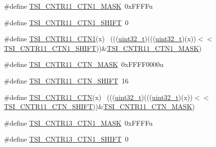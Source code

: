 \begin{DoxyCompactItemize}
\item 
\#define \hyperlink{group___t_s_i___register___masks_ga20e6e5cb203746144a70994cf2b686ef}{T\+S\+I\+\_\+\+C\+N\+T\+R11\+\_\+\+C\+T\+N1\+\_\+\+M\+A\+SK}~0x\+F\+F\+F\+Fu
\item 
\#define \hyperlink{group___t_s_i___register___masks_gad389afd656e4be5c3a0d57d32a401db5}{T\+S\+I\+\_\+\+C\+N\+T\+R11\+\_\+\+C\+T\+N1\+\_\+\+S\+H\+I\+FT}~0
\item 
\#define \hyperlink{group___t_s_i___register___masks_ga5603c5277384add87a5972f0b2360395}{T\+S\+I\+\_\+\+C\+N\+T\+R11\+\_\+\+C\+T\+N1}(x)                                          ~(((\hyperlink{_p_e___types_8h_a33594304e786b158f3fb30289278f5af}{uint32\+\_\+t})(((\hyperlink{_p_e___types_8h_a33594304e786b158f3fb30289278f5af}{uint32\+\_\+t})(x))$<$$<$\hyperlink{group___t_s_i___register___masks_gad389afd656e4be5c3a0d57d32a401db5}{T\+S\+I\+\_\+\+C\+N\+T\+R11\+\_\+\+C\+T\+N1\+\_\+\+S\+H\+I\+FT}))\&\hyperlink{group___t_s_i___register___masks_ga20e6e5cb203746144a70994cf2b686ef}{T\+S\+I\+\_\+\+C\+N\+T\+R11\+\_\+\+C\+T\+N1\+\_\+\+M\+A\+SK})
\item 
\#define \hyperlink{group___t_s_i___register___masks_ga12ceb148771123d3f985c95857174665}{T\+S\+I\+\_\+\+C\+N\+T\+R11\+\_\+\+C\+T\+N\+\_\+\+M\+A\+SK}~0x\+F\+F\+F\+F0000u
\item 
\#define \hyperlink{group___t_s_i___register___masks_ga72c3ce0896c8ead8cf9cb28dc3bbf082}{T\+S\+I\+\_\+\+C\+N\+T\+R11\+\_\+\+C\+T\+N\+\_\+\+S\+H\+I\+FT}~16
\item 
\#define \hyperlink{group___t_s_i___register___masks_ga1a9e70bef0e36f21e2432aef2cc97fc7}{T\+S\+I\+\_\+\+C\+N\+T\+R11\+\_\+\+C\+TN}(x)                                            ~(((\hyperlink{_p_e___types_8h_a33594304e786b158f3fb30289278f5af}{uint32\+\_\+t})(((\hyperlink{_p_e___types_8h_a33594304e786b158f3fb30289278f5af}{uint32\+\_\+t})(x))$<$$<$\hyperlink{group___t_s_i___register___masks_ga72c3ce0896c8ead8cf9cb28dc3bbf082}{T\+S\+I\+\_\+\+C\+N\+T\+R11\+\_\+\+C\+T\+N\+\_\+\+S\+H\+I\+FT}))\&\hyperlink{group___t_s_i___register___masks_ga12ceb148771123d3f985c95857174665}{T\+S\+I\+\_\+\+C\+N\+T\+R11\+\_\+\+C\+T\+N\+\_\+\+M\+A\+SK})
\item 
\#define \hyperlink{group___t_s_i___register___masks_ga9671deb8a78c5ef99068b0244f19f125}{T\+S\+I\+\_\+\+C\+N\+T\+R13\+\_\+\+C\+T\+N1\+\_\+\+M\+A\+SK}~0x\+F\+F\+F\+Fu
\item 
\#define \hyperlink{group___t_s_i___register___masks_gad19e50775ced3a5322d93b67c6019536}{T\+S\+I\+\_\+\+C\+N\+T\+R13\+\_\+\+C\+T\+N1\+\_\+\+S\+H\+I\+FT}~0

\end{DoxyCompactItemize}
